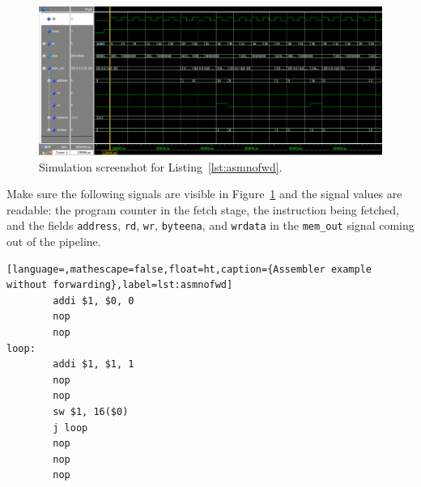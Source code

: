 \documentclass[11pt,a4paper,titlepage,oneside]{article}
\begin{document}
\maketitle


\begin{figure}[ht!]
  \centering
  \includegraphics[width=1.0\linewidth]{../screenshots/report_assembler_program.png}
  \caption{Simulation screenshot for Listing~\ref{lst:asmnofwd}.}
  \label{fig:sim}
\end{figure}

Make sure the following signals are visible in Figure~\ref{fig:sim} and the signal values are readable:
the program counter in the fetch stage, the instruction being fetched,
and the fields \texttt{address}, \texttt{rd}, \texttt{wr},
\texttt{byteena}, and \texttt{wrdata} in the \texttt{mem\_out} signal
coming out of the pipeline.

\begin{lstlisting}[language=,mathescape=false,float=ht,caption={Assembler example without forwarding},label=lst:asmnofwd]
        addi $1, $0, 0
        nop
        nop
loop:
        addi $1, $1, 1
        nop
        nop
        sw $1, 16($0)
        j loop
        nop
        nop
        nop
\end{lstlisting}
\end{document}
